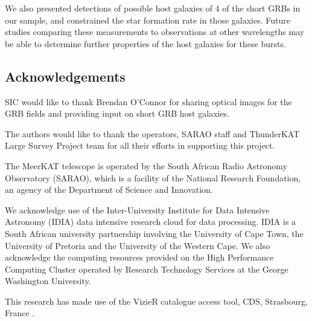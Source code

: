 \documentclass[12pt]{article}
\begin{document}
We also presented detections of possible host galaxies of 4 of the short GRBs in our sample, and constrained the star formation rate in those galaxies. Future studies comparing these measurements to observations at other wavelengths may be able to determine further properties of the host galaxies for these bursts. 


\subsection*{Acknowledgements}

SIC would like to thank Brendan O'Connor for sharing optical images for the GRB fields and providing input on short GRB host galaxies. 

The authors would like to thank the operators, SARAO staff and ThunderKAT Large Survey Project team for all their efforts in supporting this project.

The MeerKAT telescope is operated by the South African Radio Astronomy Observatory (SARAO), which is a facility of the National Research Foundation, an agency of the Department of Science and Innovation. 

We acknowledge use of the Inter-University Institute for Data Intensive Astronomy (IDIA) data intensive research cloud for data processing. IDIA is a South African university partnership involving the University of Cape Town, the University of Pretoria and the University of the Western Cape. We also acknowledge the computing resources provided on the High Performance Computing Cluster operated by Research Technology Services at the George Washington University.

This research has made use of the VizieR catalogue access tool, CDS, Strasbourg, France \citep[DOI: 10.26093/cds/vizier;][]{vizier}.
\end{document}
